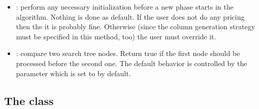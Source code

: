 \begin{itemize}
\item {}: perform any necessary initialization before a
  new phase starts in the algorithm. Nothing is done as default. If the user
  does not do any pricing then the it is probably fine.  Otherwise (since the
  column generation strategy must be specified in this method, too) the user
  must override it.
  
\item {}: compare two search tree nodes. Return true
  if the first node should be processed before the second one. The default
  behavior is controlled by the  parameter which is
  set to  by default. 

\end{itemize}

\subsection{The  class}

